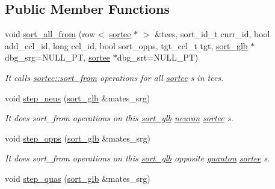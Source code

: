 \subsection*{Public Member Functions}
\begin{DoxyCompactItemize}
\item 
void \hyperlink{classsort__glb_ac755a6417f43e7860ca96317a8e8f4e8}{sort\+\_\+all\+\_\+from} (row$<$ \hyperlink{classsortee}{sortee} $\ast$ $>$ \&tees, sort\+\_\+id\+\_\+t curr\+\_\+id, bool add\+\_\+ccl\+\_\+id, long ccl\+\_\+id, bool sort\+\_\+opps, tgt\+\_\+ccl\+\_\+t tgt, \hyperlink{classsort__glb}{sort\+\_\+glb} $\ast$dbg\+\_\+srg=N\+U\+L\+L\+\_\+\+P\+T, \hyperlink{classsortee}{sortee} $\ast$dbg\+\_\+srt=N\+U\+L\+L\+\_\+\+P\+T)
\begin{DoxyCompactList}\small\item\em It calls \hyperlink{classsortee_a5cc113e22e62dfcb3869c2786ae5345e}{sortee\+::sort\+\_\+from} operations for all \hyperlink{classsortee}{sortee} s in tees. \end{DoxyCompactList}\item 
\hypertarget{classsort__glb_a25baf3b8e0bc9bdca9c0d6658b298f07}{void \hyperlink{classsort__glb_a25baf3b8e0bc9bdca9c0d6658b298f07}{step\+\_\+neus} (\hyperlink{classsort__glb}{sort\+\_\+glb} \&mates\+\_\+srg)}\label{classsort__glb_a25baf3b8e0bc9bdca9c0d6658b298f07}

\begin{DoxyCompactList}\small\item\em It does sort\+\_\+from operations on this \hyperlink{classsort__glb}{sort\+\_\+glb} \hyperlink{classneuron}{neuron} \hyperlink{classsortee}{sortee} s. \end{DoxyCompactList}\item 
\hypertarget{classsort__glb_a40a9304f2ef43071021472a8e020069a}{void \hyperlink{classsort__glb_a40a9304f2ef43071021472a8e020069a}{step\+\_\+opps} (\hyperlink{classsort__glb}{sort\+\_\+glb} \&mates\+\_\+srg)}\label{classsort__glb_a40a9304f2ef43071021472a8e020069a}

\begin{DoxyCompactList}\small\item\em It does sort\+\_\+from operations on this \hyperlink{classsort__glb}{sort\+\_\+glb} opposite \hyperlink{classquanton}{quanton} \hyperlink{classsortee}{sortee} s. \end{DoxyCompactList}\item 
\hypertarget{classsort__glb_aa41c7303e4bae7eb7c466f119c3ace1f}{void \hyperlink{classsort__glb_aa41c7303e4bae7eb7c466f119c3ace1f}{step\+\_\+quas} (\hyperlink{classsort__glb}{sort\+\_\+glb} \&mates\+\_\+srg)}\label{classsort__glb_aa41c7303e4bae7eb7c466f119c3ace1f}


\end{DoxyCompactItemize}
